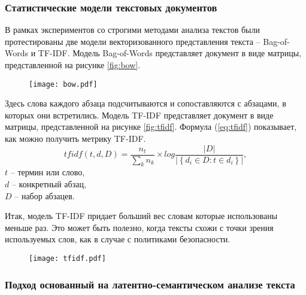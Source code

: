 \documentclass[../main]{subfiles}
\begin{document}
\subsubsection{Статистические модели текстовых документов}

В рамках экспериментов со строгими методами анализа текстов были протестированы две модели векторизованного представления текста -- Bag-of-Words и TF-IDF. Модель Bag-of-Words представляет документ в виде матрицы, представленной на рисунке \ref{fig:bow}. 

\begin{figure}[H]
    \centering
    {\texttt{[image: bow.pdf]}}
    \vspace{-\baselineskip}
\end{figure}

Здесь слова каждого абзаца подсчитываются и сопоставляются с абзацами, в которых они встретились. Модель TF-IDF представляет документ в виде матрицы, представленной на рисунке \ref{fig:tfidf}. Формула (\ref{eq:tfidf}) показывает, как можно получить метрику TF-IDF.
\begin{equation}
    \label{eq:tfidf}
    tfidf(t, d, D) = \frac{n_t}{\displaystyle\sum_k n_k} \times 
    log \frac{ \big|{D}\big| }
    { \big|\left\{ d_i \in D : t \in d_i \right\}\big| },
\end{equation}
$t$ -- термин или слово,\\
\makebox[1.25cm]{}$d$ -- конкретный абзац,\\
\makebox[1.25cm]{}$D$ -- набор абзацев. 

Итак, модель TF-IDF придает больший вес словам которые использованы меньше раз. Это может быть полезно, когда тексты схожи с точки зрения используемых слов, как в случае с политиками безопасности.

\begin{figure}[H]
    \centering
    {\texttt{[image: tfidf.pdf]}}
    \vspace{-\baselineskip}
\end{figure}

\subsubsection{Подход основанный на латентно-семантическом анализе текста}
\end{document}
